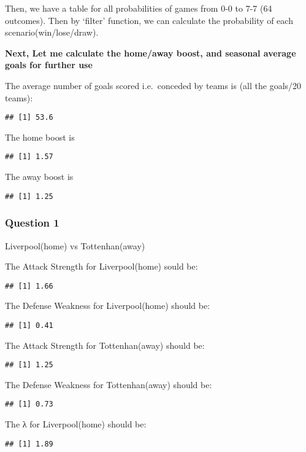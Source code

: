 \documentclass[
]{article}
\begin{document}
Then, we have a table for all probabilities of games from 0-0 to 7-7 (64 outcomes). Then by `filter' function, we can calculate the probability of each scenario(win/lose/draw).

\textbf{Next, Let me calculate the home/away boost, and seasonal average goals for further use}

The average number of goals scored i.e.~conceded by teams is (all the goals/20 teams):

\begin{verbatim}
## [1] 53.6
\end{verbatim}

The home boost is

\begin{verbatim}
## [1] 1.57
\end{verbatim}

The away boost is

\begin{verbatim}
## [1] 1.25
\end{verbatim}

\hypertarget{question-1}{%
\subsubsection{Question 1}\label{question-1}}

Liverpool(home) vs Tottenhan(away)

The Attack Strength for Liverpool(home) sould be:

\begin{verbatim}
## [1] 1.66
\end{verbatim}

The Defense Weakness for Liverpool(home) should be:

\begin{verbatim}
## [1] 0.41
\end{verbatim}

The Attack Strength for Tottenhan(away) should be:

\begin{verbatim}
## [1] 1.25
\end{verbatim}

The Defense Weakness for Tottenhan(away) should be:

\begin{verbatim}
## [1] 0.73
\end{verbatim}

The λ for Liverpool(home) should be:

\begin{verbatim}
## [1] 1.89
\end{verbatim}
\end{document}
